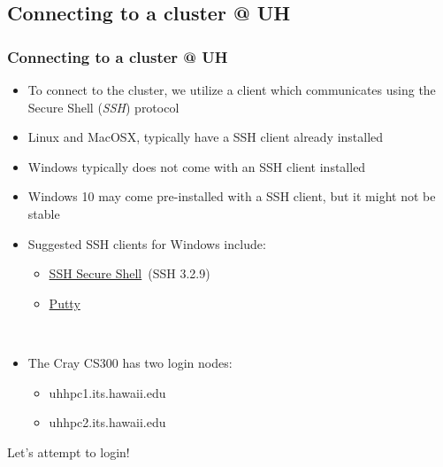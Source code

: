 \documentclass[t,hyperref={pdfpagelabels=false}]{beamer}
\begin{document}
\subsection{Connecting to a cluster @ UH}
\begin{frame}
	\frametitle{Connecting to a cluster @ UH}
	\begin{description}[\setlength{\leftmargini}{0pt}]
	\item[] \begin{itemize}
		\item To connect to the cluster, we utilize a client which communicates using the Secure Shell (\emph{SSH}) protocol 
		\item Linux and MacOSX, typically have a SSH client already installed
		\item Windows typically does not come with an SSH client installed
		\item Windows 10 may come pre-installed with a SSH client, but it might not be stable
		\item Suggested SSH clients for Windows include:
		\begin{itemize}
			\item \href{http://www.hawaii.edu/askus/685}{SSH Secure Shell}~(SSH 3.2.9)
			\item \href{http://www.chiark.greenend.org.uk/~sgtatham/putty/download.html}{Putty}
		\end{itemize}
	\end{itemize}
	\item[] ~\\
	\item[] \begin{itemize}
		\item The Cray CS300 has two login nodes:
		\begin{itemize}
			\item uhhpc1.its.hawaii.edu
			\item uhhpc2.its.hawaii.edu
		\end{itemize}
	\end{itemize}
	\end{description}
	{\large Let's attempt to login!}
\end{frame}
\end{document}
